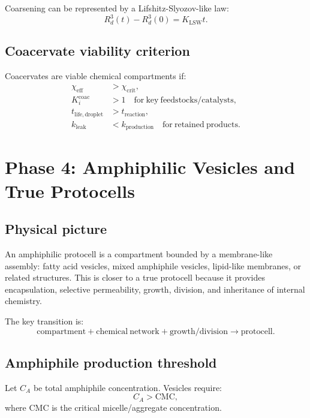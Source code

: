 \documentclass[11pt]{article}
\begin{document}
Coarsening can be represented by a Lifshitz-Slyozov-like law:
\begin{equation}
    R_d^3(t) - R_d^3(0) = K_{\mathrm{LSW}} t.
\end{equation}

\subsection{Coacervate viability criterion}

Coacervates are viable chemical compartments if:
\begin{align}
    \chi_{\mathrm{eff}} &> \chi_{\mathrm{crit}}, \\
    K_i^{\mathrm{coac}} &> 1
    \quad \mathrm{for\ key\ feedstocks/catalysts}, \\
    t_{\mathrm{life,droplet}} &> t_{\mathrm{reaction}}, \\
    k_{\mathrm{leak}} &< k_{\mathrm{production}}
    \quad \mathrm{for\ retained\ products}.
\end{align}

\section{Phase 4: Amphiphilic Vesicles and True Protocells}

\subsection{Physical picture}

An amphiphilic protocell is a compartment bounded by a membrane-like assembly:
fatty acid vesicles, mixed amphiphile vesicles, lipid-like membranes, or
related structures. This is closer to a true protocell because it provides
encapsulation, selective permeability, growth, division, and inheritance of
internal chemistry.

The key transition is:
\begin{equation}
    \mathrm{compartment}
    +
    \mathrm{chemical\ network}
    +
    \mathrm{growth/division}
    \rightarrow
    \mathrm{protocell}.
\end{equation}

\subsection{Amphiphile production threshold}

Let $C_A$ be total amphiphile concentration. Vesicles require:
\begin{equation}
    C_A > \mathrm{CMC},
\end{equation}
where CMC is the critical micelle/aggregate concentration.
\end{document}
